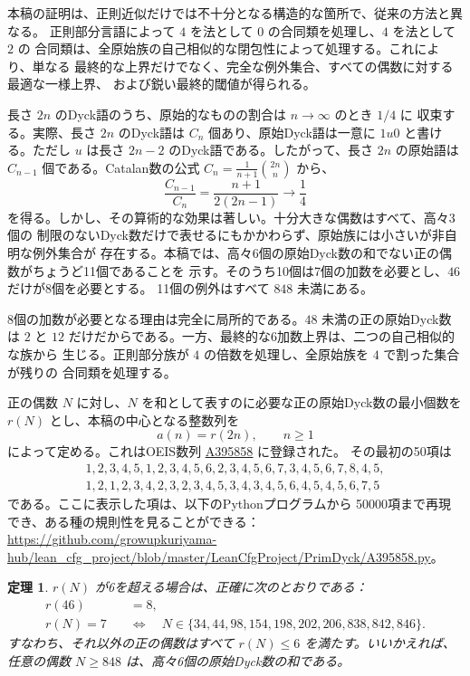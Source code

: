 \documentclass[12pt]{ltjsarticle}
\theoremstyle{plain}
\newtheorem{theorem}{定理}
\newcommand{\seqnum}[1]{\href{https://oeis.org/#1}{\rm \underline{#1}}}
\begin{document}
本稿の証明は、正則近似だけでは不十分となる構造的な箇所で、従来の方法と異なる。
正則部分言語によって $4$ を法として $0$ の合同類を処理し、$4$ を法として $2$ の
合同類は、全原始族の自己相似的な閉包性によって処理する。これにより、単なる
最終的な上界だけでなく、完全な例外集合、すべての偶数に対する最適な一様上界、
および鋭い最終的閾値が得られる。

長さ $2n$ のDyck語のうち、原始的なものの割合は $n\to\infty$ のとき $1/4$ に
収束する。実際、長さ $2n$ のDyck語は $C_n$ 個あり、原始Dyck語は一意に
$1u0$ と書ける。ただし $u$ は長さ $2n-2$ のDyck語である。したがって、長さ
$2n$ の原始語は $C_{n-1}$ 個である。Catalan数の公式
$C_n=\frac1{n+1}\binom{2n}{n}$ から、
\[
 \frac{C_{n-1}}{C_n}=\frac{n+1}{2(2n-1)}\longrightarrow\frac14
\]
を得る。しかし、その算術的な効果は著しい。十分大きな偶数はすべて、高々3個の
制限のないDyck数だけで表せるにもかかわらず、原始族には小さいが非自明な例外集合が
存在する。本稿では、高々6個の原始Dyck数の和でない正の偶数がちょうど11個であることを
示す。そのうち10個は7個の加数を必要とし、$46$だけが8個を必要とする。
11個の例外はすべて $848$ 未満にある。

8個の加数が必要となる理由は完全に局所的である。$48$ 未満の正の原始Dyck数は
$2$ と $12$ だけだからである。一方、最終的な6加数上界は、二つの自己相似的な族から
生じる。正則部分族が $4$ の倍数を処理し、全原始族を $4$ で割った集合が残りの
合同類を処理する。

正の偶数 $N$ に対し、$N$ を和として表すのに必要な正の原始Dyck数の最小個数を
$r(N)$ とし、本稿の中心となる整数列を
\[
        a(n)=r(2n),\qquad n\geq1
\]
によって定める。これはOEIS数列 \seqnum{A395858} \cite{OEIS-A395858} に登録された。
その最初の50項は
\[
\begin{gathered}
1,2,3,4,5,1,2,3,4,5,6,2,3,4,5,6,7,3,4,5,6,7,8,4,5,\\
1,2,1,2,3,4,2,3,2,3,4,5,3,4,3,4,5,6,4,5,4,5,6,7,5
\end{gathered}
\]
である。ここに表示した項は、以下のPythonプログラムから
50000項まで再現でき、ある種の規則性を見ることができる：
\url{https://github.com/growupkuriyama-hub/lean_cfg_project/blob/master/LeanCfgProject/PrimDyck/A395858.py}。

\begin{theorem}\label{thm:main}
$r(N)$ が6を超える場合は、正確に次のとおりである：
\[
\begin{aligned}
r(46) &= 8, \\[4pt]
r(N) = 7 \quad&\Longleftrightarrow\quad
 N\in\{34,44,98,154,198,202,206,838,842,846\}.
\end{aligned}
\]
すなわち、それ以外の正の偶数はすべて $r(N)\leq6$ を満たす。いいかえれば、任意の偶数
$N\geq848$ は、高々6個の原始Dyck数の和である。
\end{theorem}
\end{document}
